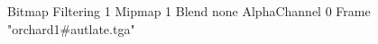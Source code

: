 {Bitmap
	{Filtering 1}
	{Mipmap 1}
	{Blend none}
	{AlphaChannel 0}
	{Frame "orchard1#autlate.tga"}
}
